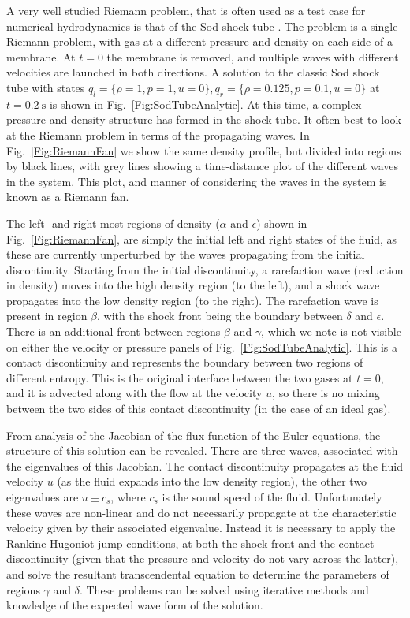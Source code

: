 A very well studied Riemann problem, that is often used as a test case for numerical hydrodynamics is that of the Sod shock tube \citep{Sod1978}.
The problem is a single Riemann problem, with gas at a different pressure and density on each side of a membrane.
At $t=0$ the membrane is removed, and multiple waves with different velocities are launched in both directions.
A solution to the classic Sod shock tube with states $q_l = \{\rho=1, p=1, u=0\}, q_r = \{\rho=0.125, p=0.1, u=0\}$ at $t=\SI{0.2}{\second}$ is shown in Fig.~\ref{Fig:SodTubeAnalytic}.
At this time, a complex pressure and density structure has formed in the shock tube.
It often best to look at the Riemann problem in terms of the propagating waves.
In Fig.~\ref{Fig:RiemannFan} we show the same density profile, but divided into regions by black lines, with grey lines showing a time-distance plot of the different waves in the system.
This plot, and manner of considering the waves in the system is known as a Riemann fan.

The left- and right-most regions of density ($\alpha$ and $\epsilon$) shown in Fig.~\ref{Fig:RiemannFan}, are simply the initial left and right states of the fluid, as these are currently unperturbed by the waves propagating from the initial discontinuity.
Starting from the initial discontinuity, a rarefaction wave (reduction in density) moves into the high density region (to the left), and a shock wave propagates into the low density region (to the right).
The rarefaction wave is present in region $\beta$, with the shock front being the boundary between $\delta$ and $\epsilon$.
There is an additional front between regions $\beta$ and $\gamma$, which we note is not visible on either the velocity or pressure panels of Fig.~\ref{Fig:SodTubeAnalytic}.
This is a contact discontinuity and represents the boundary between two regions of different entropy.
This is the original interface between the two gases at $t=0$, and it is advected along with the flow at the velocity $u$, so there is no mixing between the two sides of this contact discontinuity (in the case of an ideal gas).

From analysis of the Jacobian of the flux function of the Euler equations, the structure of this solution can be revealed.
There are three waves, associated with the eigenvalues of this Jacobian.
The contact discontinuity propagates at the fluid velocity $u$ (as the fluid expands into the low density region), the other two eigenvalues are $u\pm c_s$, where $c_s$ is the sound speed of the fluid.
Unfortunately these waves are non-linear and do not necessarily propagate at the characteristic velocity given by their associated eigenvalue.
Instead it is necessary to apply the Rankine-Hugoniot jump conditions, at both the shock front and the contact discontinuity (given that the pressure and velocity do not vary across the latter), and solve the resultant transcendental equation to determine the parameters of regions $\gamma$ and $\delta$.
These problems can be solved using iterative methods and knowledge of the expected wave form of the solution.

